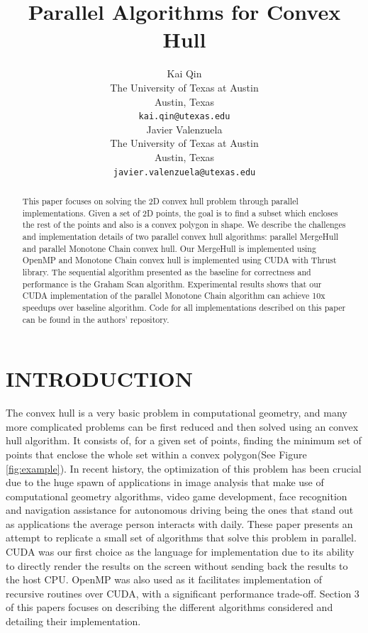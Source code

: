 \documentclass{article}
\title{Parallel Algorithms for Convex Hull}
\author{
  Kai Qin\\
  The University of Texas at Austin\\
  Austin, Texas \\
  \texttt{kai.qin@utexas.edu} \\
   \And
  Javier Valenzuela\\
  The University of Texas at Austin\\
  Austin, Texas \\
  \texttt{javier.valenzuela@utexas.edu} \\
}
\begin{document}
\maketitle

\begin{abstract}
This paper focuses on solving the 2D convex hull problem through parallel implementations. Given a set of 2D points, the goal is to find a subset which encloses the rest of the points and also is a convex polygon in shape. We describe the challenges and implementation details of two parallel convex hull algorithms: parallel MergeHull and parallel Monotone Chain convex hull. Our MergeHull is implemented using OpenMP and Monotone Chain convex hull is implemented using CUDA with Thrust library. The sequential algorithm presented as the baseline for correctness and performance is the Graham Scan algorithm. Experimental results shows that our CUDA implementation of the parallel Monotone Chain algorithm can achieve 10x speedups over baseline algorithm. Code for all implementations described on this paper can be found in the authors' repository\cite{repo}.
\end{abstract}

\section{INTRODUCTION}
The convex hull is a very basic problem in computational geometry, and many more complicated problems can be first reduced and then solved using an convex hull algorithm. It consists of, for a given set of points, finding the minimum set of points that enclose the whole set within a convex polygon(See Figure \ref{fig:example}). In recent history, the optimization of this problem has been crucial due to the huge spawn of applications in image analysis that make use of computational geometry algorithms, video game development, face recognition and navigation assistance for autonomous driving being the ones that stand out as applications the average person interacts with daily. These paper presents an attempt to replicate a small set of algorithms that solve this problem in parallel. CUDA was our first choice as the language for implementation due to its ability to directly render the results on the screen without sending back the results to the host CPU. OpenMP was also used as it facilitates implementation of recursive routines over CUDA, with a significant performance trade-off. Section 3 of this papers focuses on describing the different algorithms considered and detailing their implementation.
\end{document}
